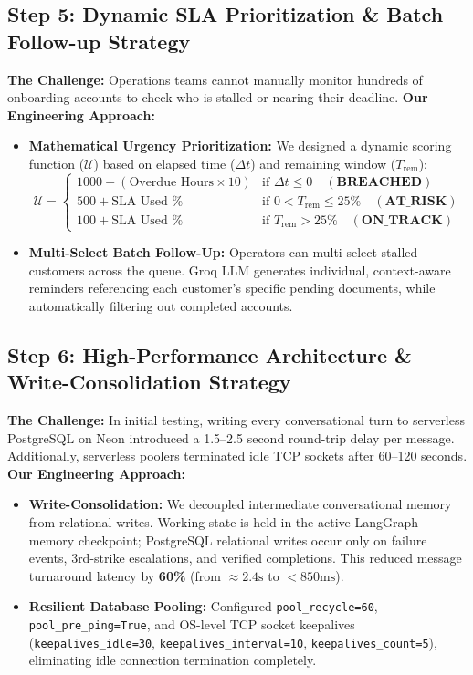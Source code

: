 \documentclass[12pt,a4paper]{article}
\begin{document}
\subsection{Step 5: Dynamic SLA Prioritization \& Batch Follow-up Strategy}
\textbf{The Challenge:} Operations teams cannot manually monitor hundreds of onboarding accounts to check who is stalled or nearing their deadline.
\textbf{Our Engineering Approach:}
\begin{itemize}
    \item \textbf{Mathematical Urgency Prioritization:} We designed a dynamic scoring function ($\mathcal{U}$) based on elapsed time ($\Delta t$) and remaining window ($T_{\text{rem}}$):
    \begin{equation}
    \mathcal{U} = 
    \begin{cases} 
    1000 + (\text{Overdue Hours} \times 10) & \text{if } \Delta t \le 0 \quad (\textbf{BREACHED}) \\
    500 + \text{SLA Used \%} & \text{if } 0 < T_{\text{rem}} \le 25\% \quad (\textbf{AT\_RISK}) \\
    100 + \text{SLA Used \%} & \text{if } T_{\text{rem}} > 25\% \quad (\textbf{ON\_TRACK})
    \end{cases}
    \end{equation}
    \item \textbf{Multi-Select Batch Follow-Up:} Operators can multi-select stalled customers across the queue. Groq LLM generates individual, context-aware reminders referencing each customer's specific pending documents, while automatically filtering out completed accounts.
\end{itemize}

\subsection{Step 6: High-Performance Architecture \& Write-Consolidation Strategy}
\textbf{The Challenge:} In initial testing, writing every conversational turn to serverless PostgreSQL on Neon introduced a 1.5--2.5 second round-trip delay per message. Additionally, serverless poolers terminated idle TCP sockets after 60--120 seconds.
\textbf{Our Engineering Approach:}
\begin{itemize}
    \item \textbf{Write-Consolidation:} We decoupled intermediate conversational memory from relational writes. Working state is held in the active LangGraph memory checkpoint; PostgreSQL relational writes occur only on failure events, 3rd-strike escalations, and verified completions. This reduced message turnaround latency by \textbf{60\%} (from $\approx 2.4\text{s}$ to $< 850\text{ms}$).
    \item \textbf{Resilient Database Pooling:} Configured \texttt{pool\_recycle=60}, \texttt{pool\_pre\_ping=True}, and OS-level TCP socket keepalives (\texttt{keepalives\_idle=30}, \texttt{keepalives\_interval=10}, \texttt{keepalives\_count=5}), eliminating idle connection termination completely.
\end{itemize}
\end{document}
